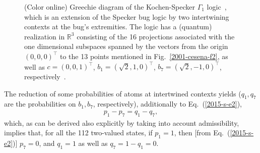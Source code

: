 \documentclass[%
  twocolumn,
 showpacs,
 showkeys,
 preprintnumbers,
 amsmath,amssymb,
 aps,
  pra,
  longbibliography,
 floatfix,
 ]{revtex4-1}
\begin{document}
\begin{figure}
\caption{\label{2017-b-f-gamma1} (Color online) Greechie diagram of the Kochen-Specker $\Gamma_1$ logic~\cite[p.~68]{kochen1},
which is an extension of the Specker bug logic by two intertwining contexts at the bug's extremities.
The logic has a (quantum) realization in $\mathbb{R}^3$
consisting of the 16 projections associated with the one dimensional subspaces
spanned by  the vectors from the origin $\left(0,0,0\right)^\intercal$ to
the 13 points mentioned in Fig.~\ref{2001-cesena-f2}, as well as
 $c          = \left(    0,0,1     \right)^\intercal $,
 $b_{1}     = \left(   \sqrt{2},1,0     \right)^\intercal $,
 $b_{7}     = \left(   \sqrt{2},-1,0     \right)^\intercal $,
respectively~\cite[p.~206, Fig.~1]{tkadlec-96}.
}
\end{figure}

The reduction of some probabilities of atoms at intertwined contexts yields
($q_1, q_7$ are the probabilities on $b_1, b_7$, respectively),
additionally to Eq.~(\ref{2015-s-e2}),
\begin{equation}
\begin{split}
p_1 - p_7 = q_1 - q_7
,
\end{split}
\label{2017-b-spa2l}
\end{equation}
which, as  can  be derived also explicitly by taking into account admissibility,
implies that, for all the 112 two-valued states, if $p_1=1$, then [from Eq.~(\ref{2015-s-e2})] $p_7=0$,
and $q_1=1$ as well as $q_7 = 1 - q_1 = 0$.
\end{document}
